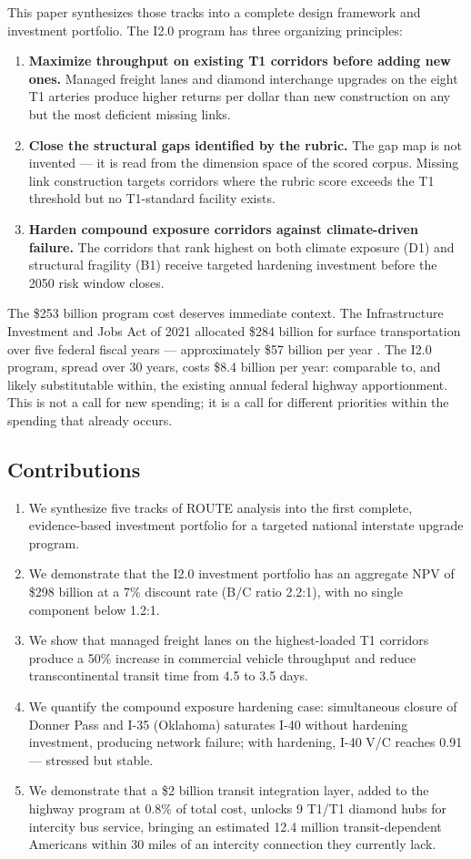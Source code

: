 This paper synthesizes those tracks into a complete design framework and investment portfolio. The I2.0 program has three organizing principles:
\begin{enumerate}
  \item \textbf{Maximize throughput on existing T1 corridors before adding new ones.} Managed freight lanes and diamond interchange upgrades on the eight T1 arteries produce higher returns per dollar than new construction on any but the most deficient missing links.
  \item \textbf{Close the structural gaps identified by the rubric.} The gap map is not invented --- it is read from the dimension space of the scored corpus. Missing link construction targets corridors where the rubric score exceeds the T1 threshold but no T1-standard facility exists.
  \item \textbf{Harden compound exposure corridors against climate-driven failure.} The corridors that rank highest on both climate exposure (D1) and structural fragility (B1) receive targeted hardening investment before the 2050 risk window closes.
\end{enumerate}

The \$253 billion program cost deserves immediate context. The Infrastructure Investment and Jobs Act of 2021 allocated \$284 billion for surface transportation over five federal fiscal years --- approximately \$57 billion per year \citep{IIJA2021}. The I2.0 program, spread over 30 years, costs \$8.4 billion per year: comparable to, and likely substitutable within, the existing annual federal highway apportionment. This is not a call for new spending; it is a call for different priorities within the spending that already occurs.

\subsection*{Contributions}
\begin{enumerate}
  \item We synthesize five tracks of ROUTE analysis into the first complete, evidence-based investment portfolio for a targeted national interstate upgrade program.
  \item We demonstrate that the I2.0 investment portfolio has an aggregate NPV of \$298 billion at a 7\% discount rate (B/C ratio 2.2:1), with no single component below 1.2:1.
  \item We show that managed freight lanes on the highest-loaded T1 corridors produce a 50\% increase in commercial vehicle throughput and reduce transcontinental transit time from 4.5 to 3.5 days.
  \item We quantify the compound exposure hardening case: simultaneous closure of Donner Pass and I-35 (Oklahoma) saturates I-40 without hardening investment, producing network failure; with hardening, I-40 V/C reaches 0.91 --- stressed but stable.
  \item We demonstrate that a \$2 billion transit integration layer, added to the highway program at 0.8\% of total cost, unlocks 9 T1/T1 diamond hubs for intercity bus service, bringing an estimated 12.4 million transit-dependent Americans within 30 miles of an intercity connection they currently lack.
\end{enumerate}
